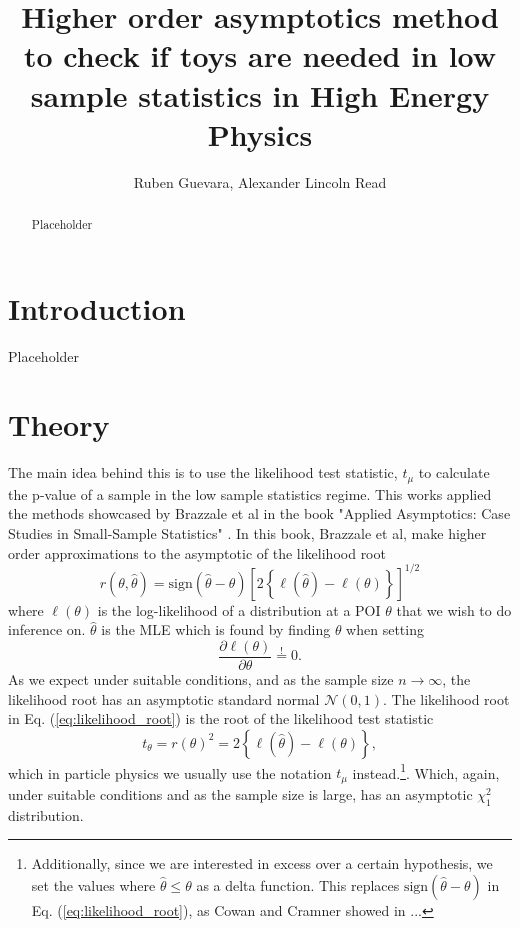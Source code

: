 \documentclass[14pt, a4paper]{article}  %
\title{Higher order asymptotics method to check if toys are needed in low sample statistics in High Energy Physics}
\author{Ruben Guevara, Alexander Lincoln Read}
\begin{document}
	\maketitle\vspace*{-10mm}
            \begin{abstract}
                Placeholder
		\end{abstract}


\section{Introduction}
Placeholder


\section{Theory}
The main idea behind this is to use the likelihood test statistic, $t_\mu$ to calculate the p-value of a sample in the low sample statistics regime. This works applied the methods showcased by Brazzale et al in the book "Applied Asymptotics: Case Studies in Small-Sample Statistics" \cite{Brazzale_Davison_Reid_2007}. In this book, Brazzale et al, make higher order approximations to the asymptotic of the likelihood root
\begin{equation}\label{eq:likelihood_root}
    r(\theta, \hat{\theta}) = \text{sign}(\hat{\theta}-\theta)\left[2\left\{\ell(\hat{\theta})-\ell(\theta)\right\}\right]^{1/2}
\end{equation}
where $\ell(\theta)$ is the log-likelihood of a distribution at a POI $\theta$ that we wish to do inference on. $\hat\theta$ is the MLE which is found by finding $\theta$ when setting
$$
\frac{\partial \ell(\theta)}{\partial\theta} \overset{!}{=} 0.
$$
As we expect under suitable conditions, and as the sample size $n\rightarrow\infty$, the likelihood root has an asymptotic standard normal $\mathcal{N}(0,1)$. The likelihood root in Eq. (\ref{eq:likelihood_root}) is the root of the likelihood test statistic 
\begin{equation}\label{eq:test_stat}
    t_\theta = r(\theta)^2 = 2\left\{\ell(\hat{\theta})-\ell(\theta)\right\},
\end{equation}
which in particle physics we usually use the notation $t_\mu$ instead.\footnote{Additionally, since we are interested in excess over a  certain hypothesis, we set the values where $\hat\theta\leq\theta$ as a delta function. This replaces $\text{sign}(\hat{\theta}-\theta)$ in Eq. (\ref{eq:likelihood_root}), as Cowan and Cramner showed in ...}. Which, again, under suitable conditions and as the sample size is large, has an asymptotic $\chi^2_1$ distribution.
\end{document}
